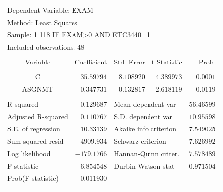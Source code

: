 \documentclass[12pt]{report}
\begin{document}
\begin{table}[H]
	\centering
	\begin{tabular}{lrrrr}
		\multicolumn{3}{l}{Dependent Variable: EXAM}&\multicolumn{1}{c}{}&\multicolumn{1}{c}{}\\
		\multicolumn{3}{l}{Method: Least Squares}&\multicolumn{1}{c}{}&\multicolumn{1}{c}{}\\
		\multicolumn{4}{l}{Sample: 1 118 IF EXAM\textgreater 0 AND ETC3440=1}&\multicolumn{1}{c}{}\\
		\multicolumn{3}{l}{Included observations: 48}&\multicolumn{1}{c}{}&\multicolumn{1}{c}{}\\
		[4.5pt] \hline \\ [-4.5pt]
		\multicolumn{1}{c}{Variable}&\multicolumn{1}{r}{Coefficient}&\multicolumn{1}{r}{Std. Error}&\multicolumn{1}{r}{t-Statistic}&\multicolumn{1}{r}{Prob.}\\
		[4.5pt] \hline \\ [-4.5pt]
		\multicolumn{1}{c}{C}&\multicolumn{1}{r}{$35.59794$}&\multicolumn{1}{r}{$8.108920$}&\multicolumn{1}{r}{$4.389973$}&\multicolumn{1}{r}{$0.0001$}\\
		\multicolumn{1}{c}{ASGNMT}&\multicolumn{1}{r}{$0.347731$}&\multicolumn{1}{r}{$0.132817$}&\multicolumn{1}{r}{$2.618119$}&\multicolumn{1}{r}{$0.0119$}\\
		[4.5pt] \hline \\ [-4.5pt]
		\multicolumn{1}{l}{R-squared}&\multicolumn{1}{r}{$0.129687$}&\multicolumn{2}{l}{Mean dependent var}&\multicolumn{1}{r}{$56.46599$}\\
		\multicolumn{1}{l}{Adjusted R-squared}&\multicolumn{1}{r}{$0.110767$}&\multicolumn{2}{l}{S.D. dependent var}&\multicolumn{1}{r}{$10.95598$}\\
		\multicolumn{1}{l}{S.E. of regression}&\multicolumn{1}{r}{$10.33139$}&\multicolumn{2}{l}{Akaike info criterion}&\multicolumn{1}{r}{$7.549025$}\\
		\multicolumn{1}{l}{Sum squared resid}&\multicolumn{1}{r}{$4909.934$}&\multicolumn{2}{l}{Schwarz criterion}&\multicolumn{1}{r}{$7.626992$}\\
		\multicolumn{1}{l}{Log likelihood}&\multicolumn{1}{r}{$-179.1766$}&\multicolumn{2}{l}{Hannan-Quinn criter.}&\multicolumn{1}{r}{$7.578489$}\\
		\multicolumn{1}{l}{F-statistic}&\multicolumn{1}{r}{$6.854548$}&\multicolumn{2}{l}{Durbin-Watson stat}&\multicolumn{1}{r}{$0.971504$}\\
		\multicolumn{1}{l}{Prob(F-statistic)}&\multicolumn{1}{r}{$0.011930$}&\multicolumn{1}{c}{}&\multicolumn{1}{c}{}&\multicolumn{1}{c}{}\\
		[4.5pt] \hline \\ [-4.5pt]
	\end{tabular}
\end{table}
\end{document}
